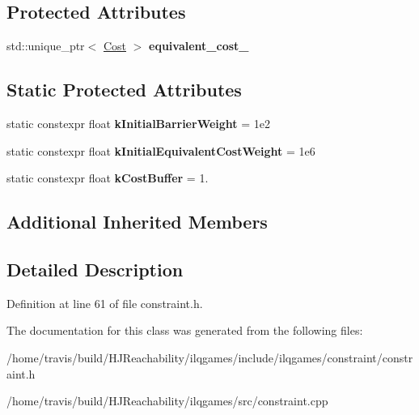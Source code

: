 \subsection*{Protected Attributes}
\begin{DoxyCompactItemize}
\item 
std\+::unique\+\_\+ptr$<$ \hyperlink{classilqgames_1_1_cost}{Cost} $>$ {\bfseries equivalent\+\_\+cost\+\_\+}\hypertarget{classilqgames_1_1_constraint_aa33d6b05a13fe556b844656f07753e37}{}\label{classilqgames_1_1_constraint_aa33d6b05a13fe556b844656f07753e37}

\end{DoxyCompactItemize}
\subsection*{Static Protected Attributes}
\begin{DoxyCompactItemize}
\item 
static constexpr float {\bfseries k\+Initial\+Barrier\+Weight} = 1e2\hypertarget{classilqgames_1_1_constraint_a1c1566fc2fa74e58b54fae57c07b7af8}{}\label{classilqgames_1_1_constraint_a1c1566fc2fa74e58b54fae57c07b7af8}

\item 
static constexpr float {\bfseries k\+Initial\+Equivalent\+Cost\+Weight} = 1e6\hypertarget{classilqgames_1_1_constraint_a64fd12449a7f42d19c68b568140699a3}{}\label{classilqgames_1_1_constraint_a64fd12449a7f42d19c68b568140699a3}

\item 
static constexpr float {\bfseries k\+Cost\+Buffer} = 1.\hypertarget{classilqgames_1_1_constraint_aaef1da643690381eca61569190863129}{}\label{classilqgames_1_1_constraint_aaef1da643690381eca61569190863129}

\end{DoxyCompactItemize}
\subsection*{Additional Inherited Members}


\subsection{Detailed Description}


Definition at line 61 of file constraint.\+h.



The documentation for this class was generated from the following files\+:\begin{DoxyCompactItemize}
\item 
/home/travis/build/\+H\+J\+Reachability/ilqgames/include/ilqgames/constraint/constraint.\+h\item 
/home/travis/build/\+H\+J\+Reachability/ilqgames/src/constraint.\+cpp\end{DoxyCompactItemize}
